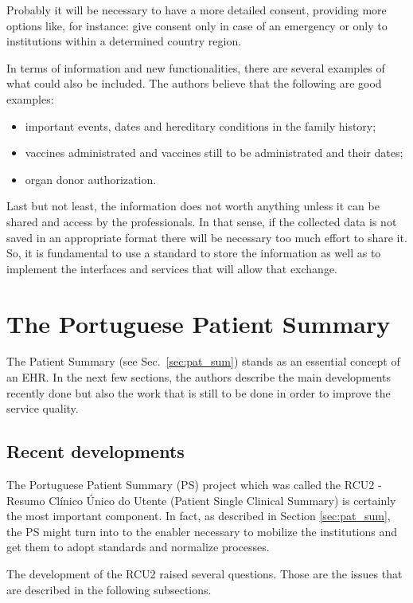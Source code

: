 Probably it will be necessary to have a more detailed consent, providing more options like, for instance: give consent only in case of an emergency or only to institutions within a determined country region.

In terms of information and new functionalities, there are several examples of what could also be included. The authors believe that the following are good examples:
\begin{itemize}
\item important events, dates and hereditary conditions in the family history;
\item vaccines administrated and vaccines still to be administrated and their dates;
\item organ donor authorization.
\end{itemize}


Last but not least, the information does not worth anything unless it can be shared and access by the professionals. In that sense, if the collected data is not saved in an appropriate format there will be necessary too much effort to share it. So, it is fundamental to use a standard to store the information as well as to implement the interfaces and services that will allow that exchange.


\section{The Portuguese Patient Summary}

The Patient Summary (see Sec.~\ref{sec:pat_sum}) stands as an essential concept of an EHR. In the next few sections, the authors describe the main developments recently done but also the work that is still to be done in order to improve the service quality.

\subsection{Recent developments}

The Portuguese Patient Summary (PS) project which was called the RCU2 - Resumo Clínico Único do Utente (Patient Single Clinical Summary) is certainly the most important component. In fact, as described in Section \ref{sec:pat_sum}, the PS might turn into to the enabler necessary to mobilize the institutions and get them to adopt standards and normalize processes.

The development of the RCU2 raised several questions. Those are the issues that are described in the following subsections.

